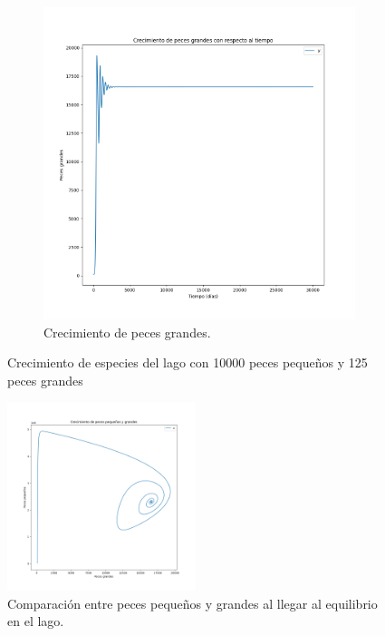 \documentclass[11pt,a4paper]{report}
\begin{document}
\begin{figure}[H]
\begin{subfigure}[b]{0.49\textwidth}
    \includegraphics[width=\textwidth, height=\textwidth]{img/Cap-3/apartado-1/peces_grandes_125.png}
    \caption{Crecimiento de peces grandes.}
    \label{fig:f2}
  \end{subfigure}
  \caption{Crecimiento de especies del lago con 10000 peces pequeños y 125 peces grandes}
\end{figure}

\begin{figure}[H]
	\begin{center}
		\includegraphics[width=0.49\textwidth]{img/Cap-3/apartado-1/peces_pequenos_grandes_125.png}
		\caption{Comparación entre peces pequeños y grandes al llegar al equilibrio en el lago.}
		\label{fig:f3}
	\end{center}
\end{figure}
\end{document}
